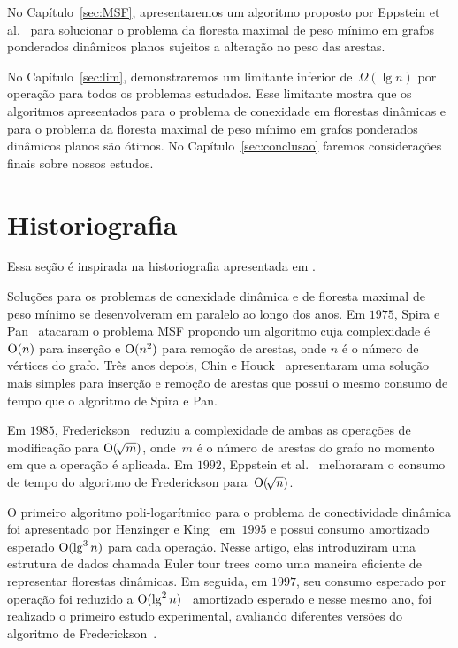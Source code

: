 No Capítulo~\ref{sec:MSF}, apresentaremos um algoritmo proposto por Eppstein et al.~\cite{EPPSTEIN-planar} para solucionar o problema da floresta maximal de peso mínimo em grafos ponderados dinâmicos planos sujeitos a alteração no peso das arestas.

No Capítulo~\ref{sec:lim}, demonstraremos um limitante inferior de~$\Omega(\lg n)$ por operação para todos os problemas estudados. Esse limitante mostra que os algoritmos apresentados para o problema de conexidade em florestas dinâmicas e para o problema da floresta maximal de peso mínimo em grafos ponderados dinâmicos planos são ótimos.
No Capítulo~\ref{sec:conclusao} faremos considerações finais sobre nossos estudos.

\newpage
\section{Historiografia}

Essa seção é inspirada na historiografia apresentada em \cite{HHSRecentAdvances2022, Zaroliagis2002}.

Soluções para os problemas de conexidade dinâmica e de floresta maximal de peso mínimo se desenvolveram em paralelo ao longo dos anos. Em $1975$, Spira e Pan~\cite{SP1975} atacaram o problema MSF propondo um algoritmo cuja complexidade é $\mathrm{O}(n)$ para inserção e $\mathrm{O}(n^2)$ para remoção de arestas, onde $n$ é o número de vértices do grafo. Três anos depois, Chin e Houck~\cite{CH1978} apresentaram uma solução mais simples para inserção e remoção de arestas que possui o mesmo consumo de tempo que o algoritmo de Spira e Pan.

Em $1985$, Frederickson~\cite{frederickson1983data} reduziu a complexidade de ambas as operações de modificação para $\mathrm{O}(\!\sqrt{m})$, onde~$m$ é o número de arestas do grafo no momento em que a operação é aplicada.
Em $1992$, Eppstein et al.~\cite{Eppstein1992SparsificationaTF,Eppstein1997SparsificationaTF} melhoraram o consumo de tempo do algoritmo de Frederickson para~$\mathrm{O}(\!\sqrt{n})$.

O primeiro algoritmo poli-logarítmico para o problema de conectividade dinâmica foi apresentado por Henzinger e King~\cite{HenzingerKing} em~$1995$ e possui consumo amortizado esperado $\mathrm{O}(\lg^3 n)$ para cada operação. Nesse artigo, elas introduziram uma estrutura de dados chamada Euler tour trees como uma maneira eficiente de representar florestas dinâmicas.
Em seguida, em $1997$, seu consumo esperado por operação foi reduzido a $\mathrm{O}(\lg^2 n)$~\cite{HenzingerThorup} amortizado esperado e nesse mesmo ano, foi realizado o primeiro estudo experimental, avaliando diferentes versões do algoritmo de Frederickson~\cite{xpAnalyGiuseppe}.

